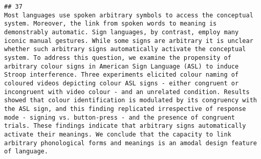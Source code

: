 \documentclass[
  english,
  man]{apa6}
\begin{document}
\begin{verbatim}
## 37                                                                                                                                                                                                                                                                                                                                                                                                                                                                                                                                                                                                                                                                                                                                                                                                                                                                                                                                                                                                                                                                                                                                                                                                                                                                                                                                                                                                                                                                                                                                                              Most languages use spoken arbitrary symbols to access the conceptual system. Moreover, the link from spoken words to meaning is demonstrably automatic. Sign languages, by contrast, employ many iconic manual gestures. While some signs are arbitrary it is unclear whether such arbitrary signs automatically activate the conceptual system. To address this question, we examine the propensity of arbitrary colour signs in American Sign Language (ASL) to induce Stroop interference. Three experiments elicited colour naming of coloured videos depicting colour ASL signs - either congruent or incongruent with video colour - and an unrelated condition. Results showed that colour identification is modulated by its congruency with the ASL sign, and this finding replicated irrespective of response mode - signing vs. button-press - and the presence of congruent trials. These findings indicate that arbitrary signs automatically activate their meanings. We conclude that the capacity to link arbitrary phonological forms and meanings is an amodal design feature of language.

\end{verbatim}
\end{document}
